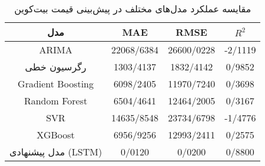 
    \begin{table}[H]
        \centering
        \begin{tabular}{|c|c|c|c|}
            \hline
            \textbf{مدل} & \textbf{MAE} & \textbf{RMSE} & \textbf{ \(R^2\) } \\
            \hline
            ARIMA & 22068/6384 & 26600/0228 & -2/1119 \\
            رگرسیون خطی & 1303/4137 & 1832/4142 & 0/9852 \\
            Gradient Boosting & 6098/2405 & 11970/7240 & 0/3698 \\
            Random Forest & 6504/4641 & 12464/2005 & 0/3167 \\
            SVR & 14635/8548 & 23734/6798 & -1/4776 \\
            XGBoost & 6956/9256 & 12993/2411 & 0/2575 \\
            مدل پیشنهادی (LSTM) & 0/0120 & 0/0200 & 0/8800 \\
            \hline
        \end{tabular}
        \caption{مقایسه عملکرد مدل‌های مختلف در پیش‌بینی قیمت بیت‌کوین}
        \label{tab:model_comparisons}
    \end{table}
    